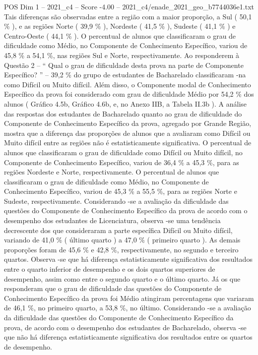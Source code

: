 \begin{textsample}{POS Dim 1 – 2021\_c4 – Score -4.00 – 2021\_c4/enade\_2021\_geo\_b7744036e1.txt}
Tais diferenças são observadas entre a região com a maior proporção, a Sul ( 50,1 \% ), e as regiões Norte ( 39,9 \% ), Nordeste ( 41,5 \% ), Sudeste ( 41,1 \% ) e Centro-Oeste ( 44,1 \% ).
O percentual de alunos que classificaram o grau de dificuldade como Médio, no Componente de Conhecimento Específico, variou de 45,8 \% a 54,1 \%, nas regiões Sul e Norte, respectivamente.
Ao responderem à Questão 2 – “ Qual o grau de dificuldade desta prova na parte de Componente Específico? ” – 39,2 \% do grupo de estudantes de Bacharelado classificaram -na como Difícil ou Muito difícil.
Além disso, o Componente modal de Conhecimento Específico da prova foi considerado com grau de dificuldade Médio por 54,2 \% dos alunos ( Gráfico 4.5b, Gráfico 4.6b, e, no Anexo IIB, a Tabela II.3b ).
A análise das respostas dos estudantes de Bacharelado quanto ao grau de dificuldade do Componente de Conhecimento Específico da prova, agregado por Grande Região, mostra que a diferença das proporções de alunos que a avaliaram como Difícil ou Muito difícil entre as regiões não é estatisticamente significativa.
O percentual de alunos que classificaram o grau de dificuldade como Difícil ou Muito difícil, no Componente de Conhecimento Específico, variou de 36,4 \% a 45,3 \%, para as regiões Nordeste e Norte, respectivamente.
O percentual de alunos que classificaram o grau de dificuldade como Médio, no Componente de Conhecimento Específico, variou de 45,3 \% a 55,5 \%, para as regiões Norte e Sudeste, respectivamente.
Considerando -se a avaliação da dificuldade das questões do Componente de Conhecimento Específico da prova de acordo com o desempenho dos estudantes de Licenciatura, observa -se uma tendência decrescente dos que consideraram a parte específica Difícil ou Muito difícil, variando de 41,0 \% ( último quarto ) a 47,0 \% ( primeiro quarto ).
As demais proporções foram de 45,6 \% e 42,8 \%, respectivamente, no segundo e terceiro quartos.
Observa -se que há diferença estatisticamente significativa dos resultados entre o quarto inferior de desempenho e os dois quartos superiores de desempenho, assim como entre o segundo quarto e o último quarto.
Já os que responderam que o grau de dificuldade das questões do Componente de Conhecimento Específico da prova foi Médio atingiram percentagens que variaram de 46,1 \%, no primeiro quarto, a 53,8 \%, no último.
Considerando -se a avaliação da dificuldade das questões do Componente de Conhecimento Específico da prova, de acordo com o desempenho dos estudantes de Bacharelado, observa -se que não há diferença estatisticamente significativa dos resultados entre os quartos de desempenho.

\end{textsample}
